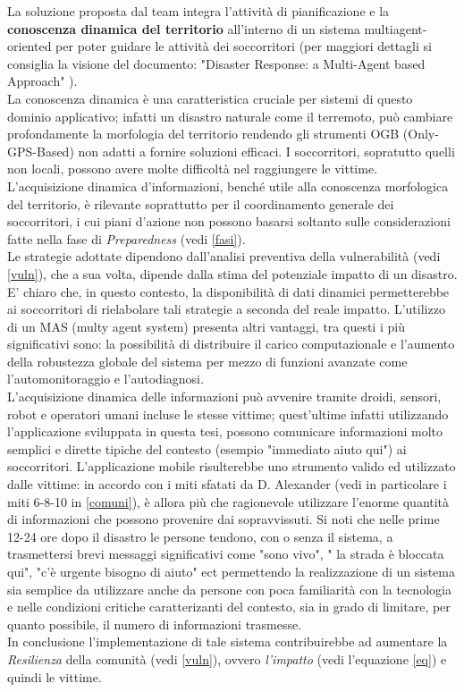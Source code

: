 La soluzione proposta dal team integra l'attività di pianificazione e la \textbf{conoscenza dinamica del territorio} all'interno di un sistema multiagent-oriented per poter guidare le attività dei soccorritori (per maggiori dettagli si consiglia la visione del documento: "Disaster Response: a Multi-Agent based Approach" \cite{RESPONSE}).\\
La conoscenza dinamica è una caratteristica cruciale per sistemi di questo dominio applicativo; infatti un disastro naturale come il terremoto, può cambiare profondamente la morfologia del territorio rendendo gli strumenti OGB (Only-GPS-Based) non adatti a fornire soluzioni efficaci. I soccorritori, sopratutto quelli non locali, possono avere molte difficoltà nel raggiungere le vittime.
\newpage
L'acquisizione dinamica d'informazioni, benché utile alla conoscenza morfologica del territorio, è rilevante soprattutto per il coordinamento generale dei soccorritori, i cui piani d'azione non possono basarsi soltanto sulle considerazioni fatte nella fase di \textit{Preparedness} (vedi \ref{fasi}).\\
 Le strategie adottate dipendono dall'analisi preventiva della vulnerabilità (vedi \ref{vuln}), che a sua volta, dipende dalla stima del potenziale impatto di un disastro.\\
 E' chiaro che, in questo contesto, la disponibilità di dati dinamici permetterebbe ai soccorritori di rielabolare tali strategie a seconda del reale impatto. 
L'utilizzo di un MAS (multy agent system) presenta altri vantaggi, tra questi i più significativi sono: la possibilità di distribuire il carico computazionale e l'aumento della robustezza globale del sistema per mezzo di funzioni avanzate come l'automonitoraggio e l'autodiagnosi.\\
L'acquisizione dinamica delle informazioni può avvenire tramite droidi, sensori, robot e operatori umani incluse le stesse vittime; quest'ultime infatti utilizzando l'applicazione sviluppata in questa tesi, possono comunicare informazioni molto semplici e dirette tipiche del contesto (esempio "immediato aiuto qui") ai soccorritori. L'applicazione mobile risulterebbe uno strumento valido ed utilizzato dalle vittime: in accordo con i miti sfatati da D. Alexander (vedi in particolare i miti 6-8-10 in \ref{comuni}), è allora più che ragionevole utilizzare l'enorme quantità di informazioni che possono provenire dai sopravvissuti. Si noti che nelle prime 12-24 ore dopo il disastro le persone tendono, con o senza il sistema, a trasmettersi brevi messaggi significativi come "sono vivo", " la strada è bloccata qui", "c'è urgente bisogno di aiuto" ect permettendo la realizzazione di un sistema sia semplice da utilizzare anche da persone con poca familiarità con la tecnologia e nelle condizioni critiche caratterizanti del contesto, sia in grado di limitare, per quanto possibile, il numero di informazioni trasmesse.\\
 In conclusione l'implementazione di tale sistema contribuirebbe ad aumentare la \textit{Resilienza} della comunità (vedi \ref{vuln}), ovvero \textit{l'impatto} (vedi l'equazione \ref{eq}) e quindi le vittime. 